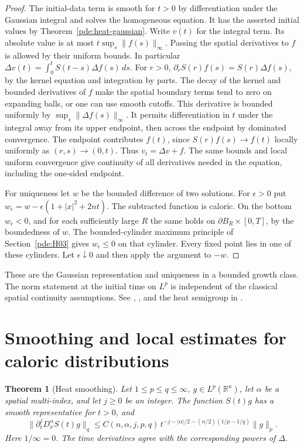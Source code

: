 \documentclass[11pt,oneside,openany]{book}
\theoremstyle{plain}
\newtheorem{theorem}{Theorem}[chapter]
\theoremstyle{definition}
\theoremstyle{remark}
\begin{document}
\begin{proof}
The initial-data term is smooth for \(t>0\) by differentiation
under the Gaussian integral and solves the homogeneous equation.
It has the asserted initial values by Theorem~\ref{pde:heat-gaussian}.
Write \(v(t)\) for the integral term. Its absolute value is at most
\(t\sup_s\|f(s)\|_\infty\). Passing the spatial derivatives to \(f\)
is allowed by their uniform bounds. In particular
\(\Delta v(t)=\int_0^t S(t-s)\Delta f(s)\,ds\).
For \(r>0\), \(\partial_r S(r)f(s)=S(r)\Delta f(s)\), by the
kernel equation and integration by parts. The decay of the kernel and
bounded derivatives of \(f\) make the spatial boundary terms tend to
zero on expanding balls, or one can use smooth cutoffs.
This derivative is bounded uniformly by \(\sup_s\|\Delta f(s)\|_\infty\).
It permits differentiation in \(t\) under the integral away from its
upper endpoint, then across the endpoint by dominated convergence.
The endpoint contributes \(f(t)\), since \(S(r)f(s)\to f(t)\) locally
uniformly as \((r,s)\to(0,t)\). Thus \(v_t=\Delta v+f\).
The same bounds and local uniform convergence give continuity of all
derivatives needed in the equation, including the one-sided endpoint.

For uniqueness let \(w\) be the bounded difference of two solutions.
For \(\epsilon>0\) put
\(w_\epsilon=w-\epsilon(1+|x|^2+2nt)\). The subtracted function is
caloric. On the bottom \(w_\epsilon<0\), and for each sufficiently
large \(R\) the same holds on \(\partial B_R\times[0,T]\), by the
boundedness of \(w\). The bounded-cylinder maximum principle
of Section~\ref{pde:H03} gives \(w_\epsilon\leq0\) on that cylinder.
Every fixed point lies in one of these cylinders. Let
\(\epsilon\downarrow0\) and then apply the argument to \(-w\).
\end{proof}

These are the Gaussian representation and uniqueness in a bounded
growth class. The norm statement at the initial time on \(L^p\) is
independent of the classical spatial continuity assumptions.
See \cite[\S\S 2.3.1 and 2.3.3]{Evans},
\cite[Chapter 6, \S 2]{TaylorI}, and the heat semigroup in \cite{D16}.

\section{Smoothing and local estimates for caloric distributions}
\label{pde:H02}

\begin{theorem}[Heat smoothing]
\label{pde:heat-lp-smoothing}
Let \(1\leq p\leq q\leq\infty\), \(g\in L^p(\mathbb R^n)\), let
\(\alpha\) be a spatial multi-index, and let \(j\geq0\) be an integer.
The function \(S(t)g\) has a smooth representative for \(t>0\), and
\[
 \bigl\|\partial_t^j D_x^\alpha S(t)g\bigr\|_{q}
 \leq C(n,\alpha,j,p,q)\,
 t^{-j-|\alpha|/2-(n/2)(1/p-1/q)}\|g\|_p .
\]
Here \(1/\infty=0\). The time derivatives agree with the corresponding
powers of \(\Delta\).
\end{theorem}
\end{document}
